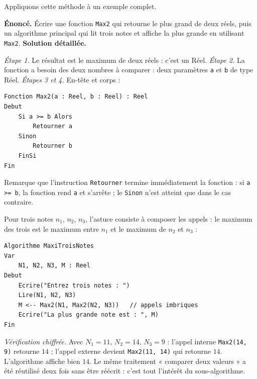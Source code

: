 \documentclass[11pt]{article}
\begin{document}
Appliquons cette méthode à un exemple complet.

\begin{exoresolu}
\textbf{Énoncé.} Écrire une fonction \texttt{Max2} qui retourne le plus grand de deux réels, puis un algorithme principal qui lit trois notes et affiche la plus grande en utilisant \texttt{Max2}.
\tcblower
\textbf{Solution détaillée.}

\emph{Étape 1.} Le résultat est le maximum de deux réels : c'est un Réel. \emph{Étape 2.} La fonction a besoin des deux nombres à comparer : deux paramètres \texttt{a} et \texttt{b} de type Réel. \emph{Étapes 3 et 4.} En-tête et corps :

\begin{lstlisting}
Fonction Max2(a : Reel, b : Reel) : Reel
Debut
    Si a >= b Alors
        Retourner a
    Sinon
        Retourner b
    FinSi
Fin
\end{lstlisting}

Remarque que l'instruction \texttt{Retourner} termine immédiatement la fonction : si \texttt{a >= b}, la fonction rend \texttt{a} et s'arrête ; le \texttt{Sinon} n'est atteint que dans le cas contraire.

Pour trois notes $n_1$, $n_2$, $n_3$, l'astuce consiste à composer les appels : le maximum des trois est le maximum entre $n_1$ et le maximum de $n_2$ et $n_3$ :

\begin{lstlisting}
Algorithme MaxiTroisNotes
Var
    N1, N2, N3, M : Reel
Debut
    Ecrire("Entrez trois notes : ")
    Lire(N1, N2, N3)
    M <-- Max2(N1, Max2(N2, N3))   // appels imbriques
    Ecrire("La plus grande note est : ", M)
Fin
\end{lstlisting}

\emph{Vérification chiffrée.} Avec $N_1 = 11$, $N_2 = 14$, $N_3 = 9$ : l'appel interne \texttt{Max2(14, 9)} retourne $14$ ; l'appel externe devient \texttt{Max2(11, 14)} qui retourne $14$. L'algorithme affiche bien $14$. Le même traitement « comparer deux valeurs » a été réutilisé deux fois sans être réécrit : c'est tout l'intérêt du sous-algorithme.
\end{exoresolu}
\end{document}
